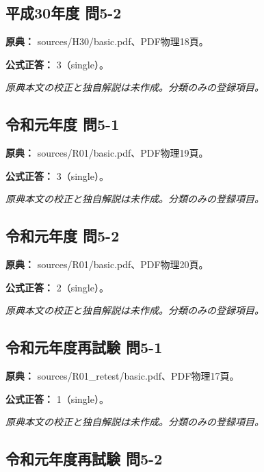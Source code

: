 \subsection{平成30年度 問5-2}
\label{q:h30-reg-basic-5-2}

\noindent\textbf{原典：} sources/H30/basic.pdf、PDF物理18頁。

\textbf{公式正答：} 3（single）。

\par\textit{原典本文の校正と独自解説は未作成。分類のみの登録項目。}

\subsection{令和元年度 問5-1}
\label{q:r01-reg-basic-5-1}

\noindent\textbf{原典：} sources/R01/basic.pdf、PDF物理19頁。

\textbf{公式正答：} 3（single）。

\par\textit{原典本文の校正と独自解説は未作成。分類のみの登録項目。}

\subsection{令和元年度 問5-2}
\label{q:r01-reg-basic-5-2}

\noindent\textbf{原典：} sources/R01/basic.pdf、PDF物理20頁。

\textbf{公式正答：} 2（single）。

\par\textit{原典本文の校正と独自解説は未作成。分類のみの登録項目。}

\subsection{令和元年度再試験 問5-1}
\label{q:r01-ret-basic-5-1}

\noindent\textbf{原典：} sources/R01\_retest/basic.pdf、PDF物理17頁。

\textbf{公式正答：} 1（single）。

\par\textit{原典本文の校正と独自解説は未作成。分類のみの登録項目。}

\subsection{令和元年度再試験 問5-2}
\label{q:r01-ret-basic-5-2}


